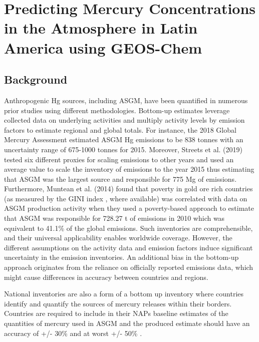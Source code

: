 \chapter{Predicting Mercury Concentrations in the Atmosphere in Latin America using GEOS-Chem }
\section{Background}
\begin{flushleft}
Anthropogenic Hg sources, including ASGM, have been quantified in numerous prior studies using different methodologies. Bottom-up estimates leverage collected data on underlying activities and multiply activity levels by emission factors to estimate regional and global totals. For instance, the 2018 Global Mercury Assessment estimated ASGM Hg emissions to be 838 tonnes with an uncertainty range of 675-1000 tonnes for 2015\cite{united_nations_environment_programme_technical_2019}. Moreover, Streets et al. (2019) tested six different proxies for scaling emissions to other years and used an average value to scale the inventory of emissions to the year 2015 thus estimating that ASGM was the largest source and responsible for 775 Mg of emissions\cite{streets_global_2019}. Furthermore, Muntean et al. (2014) found that poverty in  gold ore rich countries (as measured by the GINI index \cite{sadefo_kamdem_nice_2012}, where available) was correlated with data on ASGM production activity when they used a poverty-based approach to estimate that ASGM was responsible for 728.27 t of emissions in 2010 which was equivalent to 41.1\% of the global emissions\cite{muntean_evaluating_2018}. Such inventories are comprehensible, and their universal applicability enables worldwide coverage. However, the different assumptions on the activity data and emission factors induce significant uncertainty in the emission inventories. An additional bias in the bottom-up approach originates from the reliance on officially reported emissions data, which might cause differences in accuracy between countries and regions.

National inventories are also a form of a bottom up inventory where countries identify and quantify the sources of mercury releases within their borders. Countries are required to include in their NAPs baseline estimates of the quantities of mercury used in ASGM and the produced estimate should have an accuracy of +/- 30\% and at worst +/- 50\% \cite{united_nations_environment_programme_estimating_2017}.
\end{flushleft}

